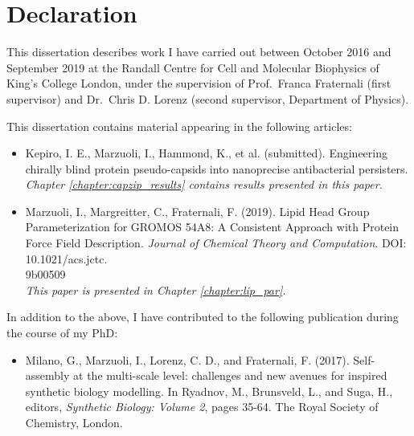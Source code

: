 \chapter*{Declaration}
\begin{onehalfspacing}

\noindent This dissertation describes work I have carried out between October 2016 and September 2019 at the Randall Centre for Cell and Molecular Biophysics of King's College London, under the supervision of Prof.\ Franca Fraternali (first supervisor) and Dr.\ Chris D. Lorenz (second supervisor, Department of Physics).

\vspace{.2cm}

\noindent This dissertation contains material appearing in the following articles:

\begin{itemize}
\item Kepiro, I. E., Marzuoli, I., Hammond, K., et al. (submitted). Engineering chirally blind protein pseudo-capsids into nanoprecise antibacterial persisters. \\
\emph{Chapter \ref{chapter:capzip_results} contains results presented in this paper.}
\item Marzuoli, I., Margreitter, C., Fraternali, F. (2019). Lipid Head Group Parameterization for GROMOS 54A8: A Consistent Approach with Protein Force Field Description. \emph{Journal of Chemical Theory and Computation}. DOI: 10.1021/acs.jctc. \\9b00509  \\
\emph{This paper is presented in Chapter \ref{chapter:lip_par}.}
\end{itemize}

\noindent In addition to the above, I have contributed to the following publication during the course of my PhD:

\begin{itemize}
%
\item Milano, G., Marzuoli, I., Lorenz, C. D., and Fraternali, F. (2017). Self-assembly at the multi-scale level: challenges and new avenues for inspired synthetic biology modelling. In Ryadnov, M., Brunsveld, L., and Suga, H., editors, \emph{Synthetic Biology: Volume 2}, pages 35-64. The Royal Society of Chemistry, London.
%
\end{itemize}



\end{onehalfspacing}
